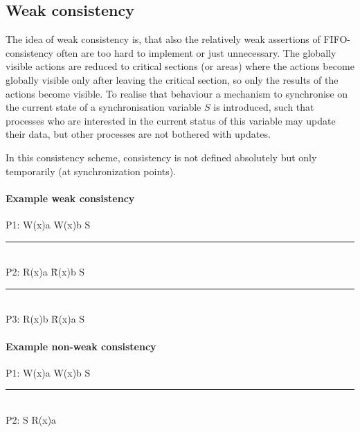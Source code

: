 \subsection{Weak consistency}
The idea of weak consistency is, that also the relatively weak assertions of FIFO-consistency often are too hard to implement or just unnecessary. The globally visible actions are reduced to critical sections (or areas) where the actions become globally visible only after leaving the critical section, so only the results of the actions become visible.
To realise that behaviour a mechanism to synchronise on the current state of a synchronisation variable \( S \) is introduced, such that processes who are interested in the current status of this variable may update their data, but other processes are not bothered with updates.

In this consistency scheme, consistency is not defined absolutely but only temporarily (at synchronization points).
\paragraph{Example weak consistency}
\begin{tabbing}
P1: W(x)a \hspace{5pt} W(x)b \hspace{5pt} S \hspace{5pt} \= \\
\rule{0.5\textwidth}{0.4pt} \\
P2: \> R(x)a \hspace{5pt} \= R(x)b \hspace{5pt} S \\
\rule{0.5\textwidth}{0.4pt} \\
P3: \> R(x)b \hspace{5pt} \= R(x)a \hspace{5pt} S \\
\end{tabbing}

\paragraph{Example non-weak consistency}
\begin{tabbing}
P1: W(x)a \hspace{5pt} W(x)b \hspace{5pt} S \hspace{5pt} \= \\
\rule{0.4\textwidth}{0.4pt} \\
P2: \> S \hspace{5pt} R(x)a \hspace{5pt} \\
\end{tabbing}

